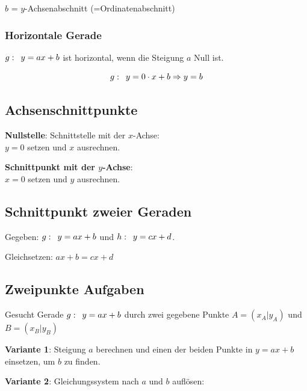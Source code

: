 \begin{multicols}{2}
$b$ = $y$-Achsenabschnitt (=Ordinatenabschnitt)


\subsubsection*{Horizontale Gerade}

$g\-:\,\,\, y=ax+b$ ist horizontal, wenn die Steigung $a$ Null ist.

$$g\-:\,\,\,  y=0\cdot{}x+b \Rightarrow y=b$$
\forceCB


\subsection*{Achsenschnittpunkte}

\textbf{Nullstelle}: Schnittstelle mit der $x$-Achse:\\
$y=0$ setzen und $x$ ausrechnen.



\textbf{Schnittpunkt mit der $y$-Achse}:\\
$x=0$ setzen und $y$ ausrechnen.


\subsection*{Schnittpunkt zweier Geraden}
Gegeben: $g\-:\,\,\, y=ax+b$ und $h\-:\,\,\, y=cx+d$.

Gleichsetzen: $ax+b = cx+d$







\subsection*{Zweipunkte Aufgaben}
Gesucht Gerade $g\-: \,\,\, y=ax+b$ durch zwei gegebene Punkte $A=(x_A|y_A)$
und $B=(x_B|y_B)$

\textbf{Variante 1}: Steigung $a$ berechnen und einen der beiden Punkte in
$y=ax+b$ einsetzen, um $b$ zu finden.

\textbf{Variante 2}: Gleichungssystem nach $a$ und $b$ auf\/lösen:


\end{multicols}
